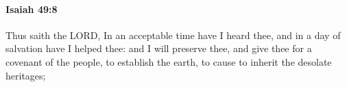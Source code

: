 
		\paragraph{Isaiah 49:8} %
			\label{ISAIAH-49-8}

			Thus saith the LORD, In an acceptable time have I heard thee, and in a day of salvation have I helped thee: and I will preserve thee, and give thee for a covenant of the people, to establish the earth, to cause to inherit the desolate heritages;


